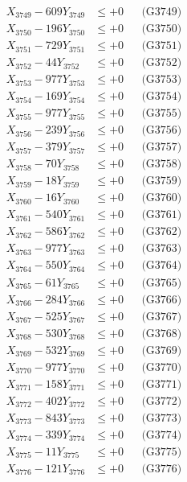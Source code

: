\documentclass[a4paper,10pt]{article}
\begin{document}
{\begin{align}
X_{3749} - 609Y_{3749} &\leq +0 && \text{(G3749)} \\
X_{3750} - 196Y_{3750} &\leq +0 && \text{(G3750)} \\
\allowbreak
X_{3751} - 729Y_{3751} &\leq +0 && \text{(G3751)} \\
X_{3752} - 44Y_{3752} &\leq +0 && \text{(G3752)} \\
X_{3753} - 977Y_{3753} &\leq +0 && \text{(G3753)} \\
X_{3754} - 169Y_{3754} &\leq +0 && \text{(G3754)} \\
X_{3755} - 977Y_{3755} &\leq +0 && \text{(G3755)} \\
X_{3756} - 239Y_{3756} &\leq +0 && \text{(G3756)} \\
X_{3757} - 379Y_{3757} &\leq +0 && \text{(G3757)} \\
X_{3758} - 70Y_{3758} &\leq +0 && \text{(G3758)} \\
X_{3759} - 18Y_{3759} &\leq +0 && \text{(G3759)} \\
X_{3760} - 16Y_{3760} &\leq +0 && \text{(G3760)} \\
\allowbreak
X_{3761} - 540Y_{3761} &\leq +0 && \text{(G3761)} \\
X_{3762} - 586Y_{3762} &\leq +0 && \text{(G3762)} \\
X_{3763} - 977Y_{3763} &\leq +0 && \text{(G3763)} \\
X_{3764} - 550Y_{3764} &\leq +0 && \text{(G3764)} \\
X_{3765} - 61Y_{3765} &\leq +0 && \text{(G3765)} \\
X_{3766} - 284Y_{3766} &\leq +0 && \text{(G3766)} \\
X_{3767} - 525Y_{3767} &\leq +0 && \text{(G3767)} \\
X_{3768} - 530Y_{3768} &\leq +0 && \text{(G3768)} \\
X_{3769} - 532Y_{3769} &\leq +0 && \text{(G3769)} \\
X_{3770} - 977Y_{3770} &\leq +0 && \text{(G3770)} \\
\allowbreak
X_{3771} - 158Y_{3771} &\leq +0 && \text{(G3771)} \\
X_{3772} - 402Y_{3772} &\leq +0 && \text{(G3772)} \\
X_{3773} - 843Y_{3773} &\leq +0 && \text{(G3773)} \\
X_{3774} - 339Y_{3774} &\leq +0 && \text{(G3774)} \\
X_{3775} - 11Y_{3775} &\leq +0 && \text{(G3775)} \\
X_{3776} - 121Y_{3776} &\leq +0 && \text{(G3776)} \\

\end{align}}
\end{document}
